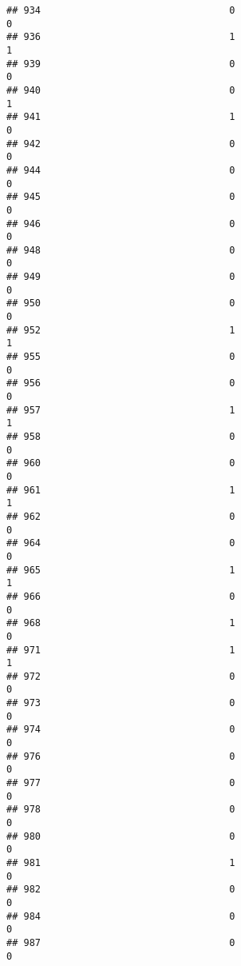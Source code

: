 \documentclass[
]{article}
\begin{document}
\begin{verbatim}
## 934                                 0                                0
## 936                                 1                                1
## 939                                 0                                0
## 940                                 0                                1
## 941                                 1                                0
## 942                                 0                                0
## 944                                 0                                0
## 945                                 0                                0
## 946                                 0                                0
## 948                                 0                                0
## 949                                 0                                0
## 950                                 0                                0
## 952                                 1                                1
## 955                                 0                                0
## 956                                 0                                0
## 957                                 1                                1
## 958                                 0                                0
## 960                                 0                                0
## 961                                 1                                1
## 962                                 0                                0
## 964                                 0                                0
## 965                                 1                                1
## 966                                 0                                0
## 968                                 1                                0
## 971                                 1                                1
## 972                                 0                                0
## 973                                 0                                0
## 974                                 0                                0
## 976                                 0                                0
## 977                                 0                                0
## 978                                 0                                0
## 980                                 0                                0
## 981                                 1                                0
## 982                                 0                                0
## 984                                 0                                0
## 987                                 0                                0

\end{verbatim}
\end{document}
